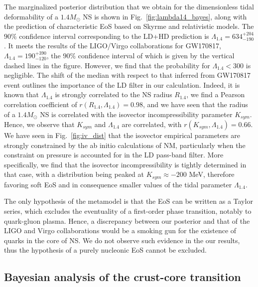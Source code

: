 The marginalized posterior distribution that we obtain for the dimensionless 
tidal deformability of a $1.4M_\odot$ NS is shown in 
Fig.~\ref{fig:lambda14_bayes}, along with the prediction of characteristic EoS
based on Skyrme and relativistic models. The $90\%$ confidence interval
corresponding to the LD+HD prediction is $\Lambda_{1.4}=634_{-190}^{+204}$. It 
meets the results of the LIGO/Virgo collaborations for GW170817, 
$\Lambda_{1.4}=190_{-120}^{+390}$, the $90\%$ confidence interval of which is 
given by the vertical dashed lines in the figure. 
However, we find that the probability for $\Lambda_{1.4} < 300$ is 
negligible. The shift of the median with respect to that inferred from
GW170817 event outlines the importance of the LD filter in our calculation.
Indeed, it is known that $\Lambda_{1.4}$ is strongly correlated to the NS
radius $R_{1.4}$, we find a Pearson correlation coefficient of $r(R_{1.4},
\Lambda_{1.4})=0.98$, and we have seen that the radius of a $1.4M_\odot$ NS is 
correlated with the isovector incompressibility parameter $K_{sym}$. Hence, 
we observe that $K_{sym}$ and $\Lambda_{1.4}$ are correlated, with
$r(K_{sym},\Lambda_{1.4}) = 0.66$. We have seen in Fig.~\ref{fig:iv_dist} that 
the isovector empirical parameters are strongly constrained by the ab initio 
calculations of NM, particularly when the constraint on pressure is accounted 
for in the LD pass-band filter. More specifically, we find that the 
isovector incompressibility is tightly determined in that case, with a 
distribution being peaked at $K_{sym} \approx -200$ MeV, therefore favoring 
soft EoS and in consequence smaller values of the tidal parameter 
$\Lambda_{1.4}$.
%

{The only hypothesis of the metamodel is that the EoS can be
  written as a Taylor series, which excludes the eventuality of a first-order 
  phase transition, notably to quark-gluon plasma.
Hence, a discrepancy between our posterior and that of the
LIGO and Virgo collaborations would be a smoking gun for the existence of
quarks in the core of NS. We do not observe such evidence in the our results, 
thus the hypothesis of a purely nucleonic EoS cannot be excluded.}

\subsection{Bayesian analysis of the crust-core
transition}\label{subsec:cc_bayes}

